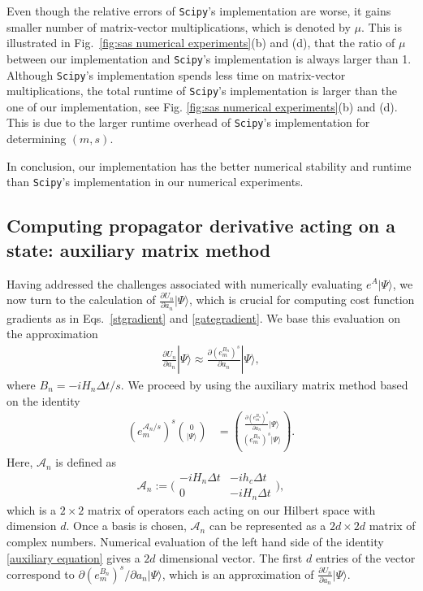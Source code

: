 \documentclass[12pt]{article}
\newcommand{\dket}[1]{|#1\rangle}
\begin{document}
Even though the relative errors of \texttt{Scipy}'s implementation are worse, it gains smaller number of matrix-vector multiplications, which is denoted by $\mu$. This is illustrated in Fig.\ \ref{fig:sas numerical experiments}(b) and (d), that the ratio of $\mu$ between our implementation and \texttt{Scipy}'s implementation is always larger than 1. Although \texttt{Scipy}'s implementation spends less time on matrix-vector multiplications, the total runtime of \texttt{Scipy}'s implementation is larger than the one of our implementation, see Fig. \ref{fig:sas numerical experiments}(b) and (d). This is due to the larger runtime overhead of \texttt{Scipy}'s implementation for determining $(m,s)$. 

In conclusion, our implementation has the better numerical stability and runtime than \texttt{Scipy}'s implementation in our numerical experiments. 


\subsection{Computing propagator derivative acting on a state: auxiliary matrix method}
Having addressed the challenges associated with numerically evaluating $e^A\dket{\Psi}$, we now turn to the calculation of $\frac{\partial U_n}{\partial a_n} \dket{\Psi}$, which is crucial for computing cost function gradients as in Eqs.\ \eqref{stgradient} and \eqref{gategradient}. We base this evaluation on the approximation 
\begin{align}
    \frac{\partial U_n}{\partial a_n} \dket{\Psi}\approx \frac{\partial (e^{B_n}_m)^s}{\partial a_n} \dket{\Psi},
\end{align}
where $B_n={-iH_n\Delta t}/{s}$. We proceed by using the auxiliary matrix method based on the identity \cite{auxigoodwin2015auxiliary,najfeld1995derivatives}
\begin{equation}
\label{auxiliary equation}
    \begin{aligned}
    (e^{\mathcal{A}_n/s}_m)^s
    \binom{0}{|\Psi\rangle}&=
    \binom{
    \frac{\partial (e^{B_{n}}_m)^s}{\partial a_n}  \dket{\Psi}}{{(e^{B_n}_m)^s|\Psi\rangle}}.
\end{aligned}
\end{equation}
Here, $\mathcal{A}_n$ is defined as
\begin{equation}
\mathcal{A}_n:=
{\biggl(\begin{matrix}
-iH_n \Delta t& -ih_c\Delta t \\
0 & -iH_n\Delta t
\end{matrix}\biggr)},
\end{equation}
which is a $2\times2$ matrix of operators each acting on our Hilbert space with dimension $d$. Once a basis is chosen, $\mathcal{A}_n$ can be represented as a $2d\times2d$ matrix of complex numbers. Numerical evaluation of the left hand side of the identity \eqref{auxiliary equation} gives a $2d$ dimensional vector. The first $d$ entries of the vector correspond to $\partial (e^{B_n}_m)^s / \partial a_n \dket{\Psi}$, which is an approximation of $\frac{\partial U_n}{\partial a_n} \dket{\Psi}$. 
\end{document}
